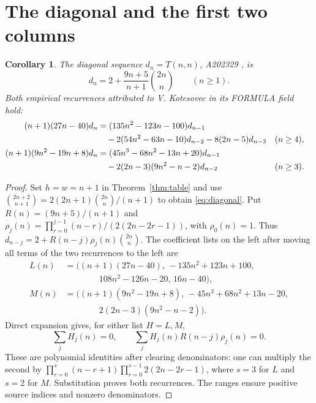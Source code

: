 \documentclass[11pt]{article}
\newtheorem{corollary}[theorem]{Corollary}
\newcommand{\bin}[2]{\binom{#1}{#2}}
\begin{document}
\section{The diagonal and the first two columns}
\begin{corollary}\label{cor:diagonal}
The diagonal sequence $d_n=T(n,n)$, A202329 \cite{diagonal}, is
\begin{equation}\label{eq:diagonal}
                 d_n=2+\frac{9n+5}{n+1}\bin{2n}{n}\qquad(n\ge1).
\end{equation}
Both empirical recurrences attributed to V. Kotesovec in its FORMULA field hold:
\begin{align}
(n+1)(27n-40)d_n
 &=(135n^2-123n-100)d_{n-1}\notag\\
 &\quad-2(54n^2-63n-10)d_{n-2}-8(2n-5)d_{n-3}
                   &&(n\ge4),\label{eq:kotthree}\\
(n+1)(9n^2-19n+8)d_n
 &=(45n^3-68n^2-13n+20)d_{n-1}\notag\\
 &\quad-2(2n-3)(9n^2-n-2)d_{n-2}
                   &&(n\ge3).\label{eq:kottwo}
\end{align}
\end{corollary}
\begin{proof}
Set $h=w=n+1$ in Theorem~\ref{thm:table} and use
$\bin{2n+2}{n+1}=2(2n+1)\bin{2n}{n}/(n+1)$ to obtain \eqref{eq:diagonal}.
Put $R(n)=(9n+5)/(n+1)$ and
$\rho_j(n)=\prod_{r=0}^{j-1}(n-r)/(2(2n-2r-1))$, with $\rho_0(n)=1$.
Thus $d_{n-j}=2+R(n-j)\rho_j(n)\bin{2n}{n}$.
The coefficient lists on the left after moving all terms of the two recurrences to the left are
\begin{align*}
 L(n)&=\bigl((n+1)(27n-40),\,-135n^2+123n+100,\\
 &\hspace{4em}108n^2-126n-20,\,16n-40\bigr),\\
 M(n)&=\bigl((n+1)(9n^2-19n+8),\,-45n^3+68n^2+13n-20,\\
 &\hspace{4em}2(2n-3)(9n^2-n-2)\bigr).
\end{align*}
Direct expansion gives, for either list $H=L,M$,
\[
 \sum_j H_j(n)=0,\qquad
 \sum_j H_j(n)R(n-j)\rho_j(n)=0.
\]
These are polynomial identities after clearing denominators: one can multiply the second by
$\prod_{r=0}^{s}(n-r+1)\prod_{r=0}^{s-1}2(2n-2r-1)$, where $s=3$ for $L$ and $s=2$ for $M$.
Substitution proves both recurrences. The ranges ensure positive source indices and nonzero denominators.
\end{proof}
\end{document}
